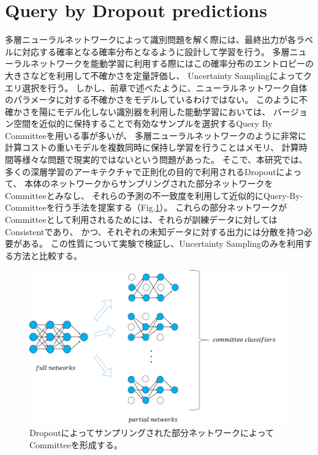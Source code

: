 \section{Query by Dropout predictions}
多層ニューラルネットワークによって識別問題を解く際には、最終出力が各ラベルに対応する確率となる確率分布となるように設計して学習を行う。
多層ニューラルネットワークを能動学習に利用する際にはこの確率分布のエントロピーの大きさなどを利用して不確かさを定量評価し、
Uncertainty Samplingによってクエリ選択を行う。
しかし、前章で述べたように、ニューラルネットワーク自体のパラメータに対する不確かさをモデルしているわけではない。
このように不確かさを陽にモデル化しない識別器を利用した能動学習においては、
バージョン空間を近似的に保持することで有効なサンプルを選択するQuery By Committeeを用いる事が多いが、
多層ニューラルネットワークのように非常に計算コストの重いモデルを複数同時に保持し学習を行うことはメモリ、
計算時間等様々な問題で現実的ではないという問題があった。
そこで、本研究では、多くの深層学習のアーキテクチャで正則化の目的で利用されるDropoutによって、
本体のネットワークからサンプリングされた部分ネットワークをCommitteeとみなし、
それらの予測の不一致度を利用して近似的にQuery-By-Committeeを行う手法を提案する（Fig.\ref{fig:query_by_dropout}）。
これらの部分ネットワークがCommitteeとして利用されるためには、それらが訓練データに対してはConsistentであり、
かつ、それぞれの未知データに対する出力には分散を持つ必要がある。
この性質について実験で検証し、Uncertainty Samplingのみを利用する方法と比較する。

\begin{figure}[tbp]
    \label{fig:query_by_dropout}
     \begin{center}
      \includegraphics[width=120mm]{figures/query_by_dropout.png}
     \end{center}
    \caption{Dropoutによってサンプリングされた部分ネットワークによってCommitteeを形成する。}
\end{figure}

